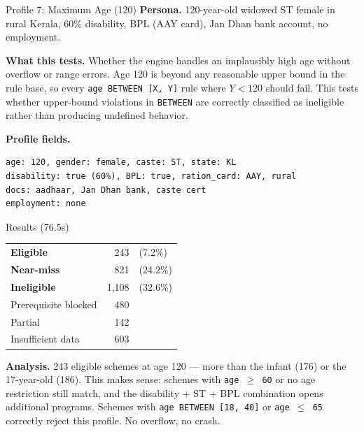 \documentclass[11pt,a4paper]{article}
\newcommand{\ic}[1]{\texttt{\color{accent}#1}}
\begin{document}
\begin{profilebox}{Profile 7: Maximum Age (120)}
\textbf{Persona.} 120-year-old widowed ST female in rural Kerala, 60\% disability, BPL (AAY card), Jan Dhan bank account, no employment.

\textbf{What this tests.} Whether the engine handles an implausibly high age without overflow or range errors. Age 120 is beyond any reasonable upper bound in the rule base, so every \ic{age BETWEEN [X, Y]} rule where $Y < 120$ should fail. This tests whether upper-bound violations in \ic{BETWEEN} are correctly classified as ineligible rather than producing undefined behavior.

\textbf{Profile fields.}
\begin{lstlisting}
age: 120, gender: female, caste: ST, state: KL
disability: true (60%), BPL: true, ration_card: AAY, rural
docs: aadhaar, Jan Dhan bank, caste cert
employment: none
\end{lstlisting}

\begin{resultbox}{Results (76.5s)}
\begin{tabular}{@{}lrl@{}}
  \textcolor{eligible}{\textbf{Eligible}} & 243 & (7.2\%) \\
  \textcolor{nearmiss}{\textbf{Near-miss}} & 821 & (24.2\%) \\
  \textcolor{inelig}{\textbf{Ineligible}} & 1{,}108 & (32.6\%) \\
  Prerequisite blocked & 480 & \\
  Partial & 142 & \\
  Insufficient data & 603 & \\
\end{tabular}
\end{resultbox}

\textbf{Analysis.} 243 eligible schemes at age 120 --- more than the infant (176) or the 17-year-old (186). This makes sense: schemes with \ic{age $\geq$ 60} or no age restriction still match, and the disability + ST + BPL combination opens additional programs. Schemes with \ic{age BETWEEN [18, 40]} or \ic{age $\leq$ 65} correctly reject this profile. No overflow, no crash.
\end{profilebox}
\end{document}
